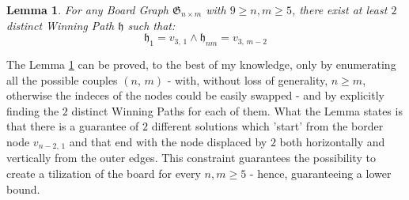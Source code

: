 \documentclass[conference]{IEEEtran}
\newtheorem{lemma}{Lemma}[section]
\begin{document}
\begin{lemma} \label{lem:two_boards_horizontal}
    For any Board Graph $\mathfrak{G}_{n \times m}$ with $9 \ge n, m \ge 5$, there exist at least $2$ distinct Winning Path $\mathfrak{h}$ such that:
    $$
        \mathfrak{h}_1 = v_{3,\,1} \land \mathfrak{h}_{nm} = v_{3,\,m-2} 
    $$
\end{lemma}

The Lemma \ref{lem:two_boards_horizontal} can be proved, to the best of my knowledge, only by enumerating all the possible couples $(n,\,m)$ - with, without loss of generality, $n \ge m$, otherwise the indeces of the nodes could be easily swapped -
and by explicitly finding the $2$ distinct Winning Paths for each of them.
What the Lemma states is that there is a guarantee of $2$ different solutions which 'start' from the border node $v_{n-2,\,1}$ and that end with the node displaced by $2$ both horizontally and vertically from the outer edges.
This constraint guarantees the possibility to create a tilization of the board for every $n, m \ge 5$ - hence, guaranteeing a lower bound.
\end{document}
